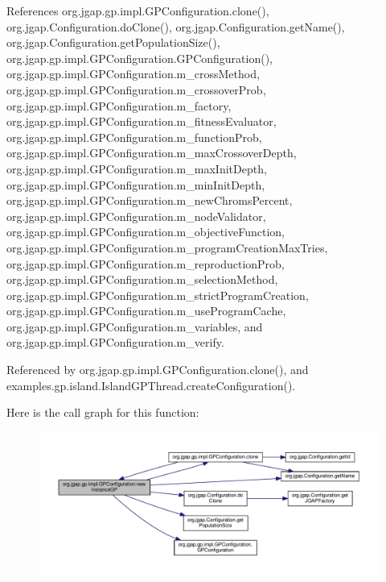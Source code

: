 References org.\-jgap.\-gp.\-impl.\-G\-P\-Configuration.\-clone(), org.\-jgap.\-Configuration.\-do\-Clone(), org.\-jgap.\-Configuration.\-get\-Name(), org.\-jgap.\-Configuration.\-get\-Population\-Size(), org.\-jgap.\-gp.\-impl.\-G\-P\-Configuration.\-G\-P\-Configuration(), org.\-jgap.\-gp.\-impl.\-G\-P\-Configuration.\-m\-\_\-cross\-Method, org.\-jgap.\-gp.\-impl.\-G\-P\-Configuration.\-m\-\_\-crossover\-Prob, org.\-jgap.\-gp.\-impl.\-G\-P\-Configuration.\-m\-\_\-factory, org.\-jgap.\-gp.\-impl.\-G\-P\-Configuration.\-m\-\_\-fitness\-Evaluator, org.\-jgap.\-gp.\-impl.\-G\-P\-Configuration.\-m\-\_\-function\-Prob, org.\-jgap.\-gp.\-impl.\-G\-P\-Configuration.\-m\-\_\-max\-Crossover\-Depth, org.\-jgap.\-gp.\-impl.\-G\-P\-Configuration.\-m\-\_\-max\-Init\-Depth, org.\-jgap.\-gp.\-impl.\-G\-P\-Configuration.\-m\-\_\-min\-Init\-Depth, org.\-jgap.\-gp.\-impl.\-G\-P\-Configuration.\-m\-\_\-new\-Chroms\-Percent, org.\-jgap.\-gp.\-impl.\-G\-P\-Configuration.\-m\-\_\-node\-Validator, org.\-jgap.\-gp.\-impl.\-G\-P\-Configuration.\-m\-\_\-objective\-Function, org.\-jgap.\-gp.\-impl.\-G\-P\-Configuration.\-m\-\_\-program\-Creation\-Max\-Tries, org.\-jgap.\-gp.\-impl.\-G\-P\-Configuration.\-m\-\_\-reproduction\-Prob, org.\-jgap.\-gp.\-impl.\-G\-P\-Configuration.\-m\-\_\-selection\-Method, org.\-jgap.\-gp.\-impl.\-G\-P\-Configuration.\-m\-\_\-strict\-Program\-Creation, org.\-jgap.\-gp.\-impl.\-G\-P\-Configuration.\-m\-\_\-use\-Program\-Cache, org.\-jgap.\-gp.\-impl.\-G\-P\-Configuration.\-m\-\_\-variables, and org.\-jgap.\-gp.\-impl.\-G\-P\-Configuration.\-m\-\_\-verify.



Referenced by org.\-jgap.\-gp.\-impl.\-G\-P\-Configuration.\-clone(), and examples.\-gp.\-island.\-Island\-G\-P\-Thread.\-create\-Configuration().



Here is the call graph for this function\-:
\nopagebreak
\begin{figure}[H]
\begin{center}
\leavevmode
\includegraphics[width=350pt]{classorg_1_1jgap_1_1gp_1_1impl_1_1_g_p_configuration_a35dc7d18a6256cddae069533506f7edf_cgraph}
\end{center}
\end{figure}



